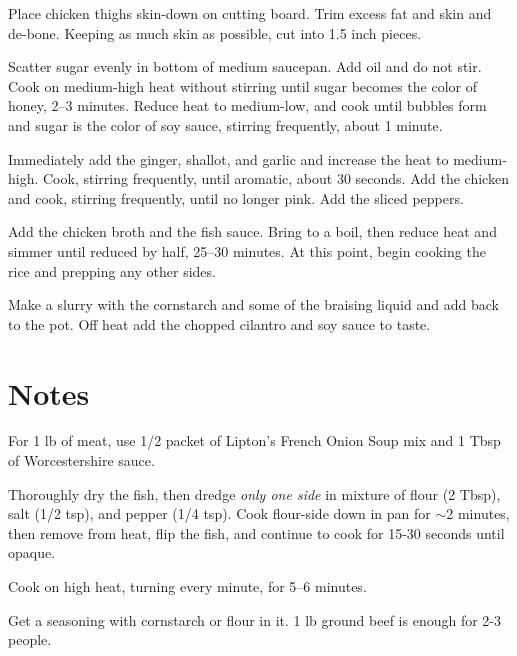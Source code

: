 \documentclass[oneside]{book}  %
\def\thisrecipe{}  %
\newcommand{\recipe}[1]{\section{#1}\def\thisrecipe{: #1}} %
\newcommand{\about}{$\sim$}
\begin{document}
\begin{directions}
  \item Place chicken thighs skin-down on cutting board. Trim excess fat and
    skin and de-bone. Keeping as much skin as possible, cut into 1.5 inch
    pieces.

  \item Scatter sugar evenly in bottom of medium saucepan. Add oil and do not
    stir. Cook on medium-high heat without stirring until sugar becomes the
    color of honey, 2--3 minutes. Reduce heat to medium-low, and cook until
    bubbles form and sugar is the color of soy sauce, stirring frequently, about
    1 minute.

  \item Immediately add the ginger, shallot, and garlic and increase the heat to
    medium-high. Cook, stirring frequently, until aromatic, about 30 seconds.
    Add the chicken and cook, stirring frequently, until no longer pink. Add the
    sliced peppers.

  \item Add the chicken broth and the fish sauce. Bring to a boil, then reduce
    heat and simmer until reduced by half, 25--30 minutes. At this point, begin
    cooking the rice and prepping any other sides.

  \item Make a slurry with the cornstarch and some of the braising liquid and
    add back to the pot. Off heat add the chopped cilantro and soy sauce to
    taste.
\end{directions}
\recipe{Notes} \label{notes:dinners_standalone} %
\begin{kitchennotes}
  \item[Hot Dogs and Hamburgers] \label{recipe:hot_dogs_and_hamburgers}
     
    For 1 lb of meat, use 1/2 packet of Lipton's French Onion Soup mix and 1
    Tbsp of Worcestershire sauce.
  \item[Pan-Seared Thin Fish] \label{recipe:pan-seared_thin_fish}
     
    Thoroughly dry the fish, then dredge \emph{only one side} in mixture of
    flour (2 Tbsp), salt (1/2 tsp), and pepper (1/4 tsp). Cook flour-side down
    in pan for \about 2 minutes, then remove from heat, flip the fish, and
    continue to cook for 15-30 seconds until opaque.
  \item[Steak] \label{recipe:steak}
     
    Cook on high heat, turning every minute, for 5--6 minutes.
  \item[Tacos] \label{recipe:tacos}
     
    Get a seasoning with cornstarch or flour in it. 1 lb ground beef is enough
    for 2-3 people.
\end{kitchennotes}
\end{document}
